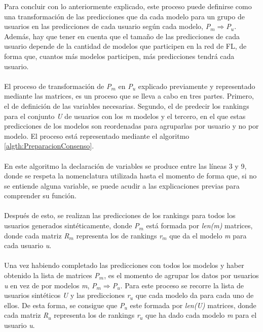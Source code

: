 Para concluir con lo anteriormente explicado, este proceso puede definirse como una transformación de las predicciones que da cada modelo para un grupo de usuarios en las predicciones de cada usuario según cada modelo, \textit{P$_{m}$}$\Longrightarrow $\textit{P$_{u}$}. Además, hay que tener en cuenta que el tamaño de las predicciones de cada usuario depende de la cantidad de modelos que participen en la red de FL, de forma que, cuantos más modelos participen, más predicciones tendrá cada usuario. 
\\ \\
El proceso de transformación de \textit{P$_{m}$} en \textit{P$_{u}$} explicado previamente y representado mediante las matrices, es un proceso que se lleva a cabo en tres partes. Primero, el de definición de las variables necesarias. Segundo, el de predecir los rankings para el conjunto \textit{U} de usuarios con los \textit{m} modelos y el tercero, en el que estas predicciones de los modelos son reordenadas para agruparlas por usuario y no por modelo. El proceso está representado mediante el algoritmo \ref{algth:PreparacionConsenso}.
\\ \\
En este algoritmo la declaración de variables se produce entre las líneas 3 y 9, donde se respeta la nomenclatura utilizada hasta el momento de forma que, si no se entiende alguna variable, se puede acudir a las explicaciones previas para comprender su función. 
\\ \\
Después de esto, se realizan las predicciones de los rankings para todos los usuarios generados sintéticamente, donde \textit{P$_{m}$} está formada por \textit{len(m)} matrices, donde cada matriz \textit{R$_{m}$} representa los de rankings \textit{r$_{m}$} que da el modelo \textit{m} para cada usuario \textit{u}.
\\ \\
Una vez habiendo completado las predicciones con todos los modelos y haber obtenido la lista de matrices \textit{P$_{m}$}, es el momento de agrupar los datos por usuarios \textit{u} en vez de por modelos \textit{m}, \textit{P$_{m}$}$\Longrightarrow $\textit{P$_{u}$}. Para este proceso se recorre la lista de usuarios sintéticos \textit{U} y las predicciones \textit{r$_{u}$} que cada modelo da para cada uno de ellos. De esta forma, se consigue que \textit{P$_{u}$} este formada por \textit{len(U)} matrices, donde cada matriz \textit{R$_{u}$} representa los de rankings \textit{r$_{u}$} que ha dado cada modelo \textit{m} para el usuario \textit{u}. 
